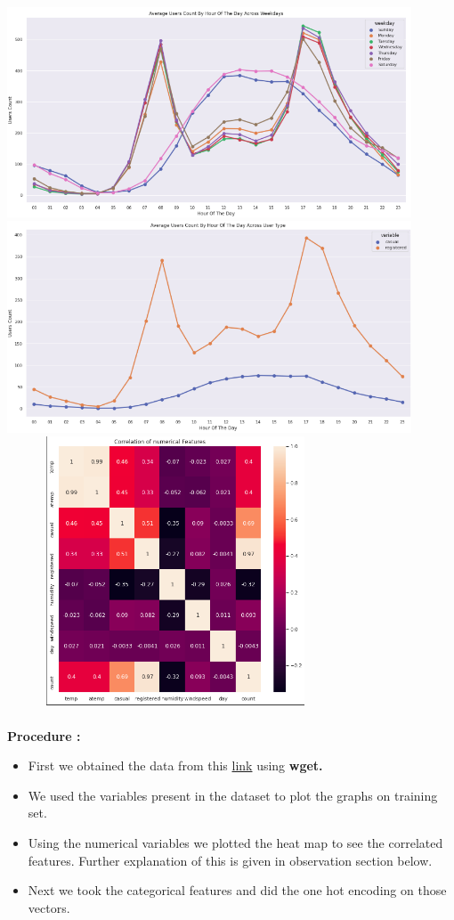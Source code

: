 \documentclass[english,a4paper,12pt]{article}
\begin{document}
\begin{enumerate}
\vspace{1cm}
\includegraphics[width=12cm]{pictures/Plot_Q4_4.png} \\
\vspace{1cm}
\includegraphics[width=12cm]{pictures/Plot_Q4_5.png} \\

\includegraphics[width=10cm,height=8cm]{pictures/CorrelnPlot_Q4.png} \\\\
\textbullet\textbf{Procedure :}
\begin{itemize}
    \item First we obtained the data from this \href{https://archive.ics.uci.edu/ml/machine-learning-databases/00275/Bike-Sharing-Dataset.zip}{link} using \textbf{wget.}
    \item We used the variables present in the dataset to plot the graphs on training set.
    \item Using the numerical variables we plotted the heat map to see the correlated features. Further explanation of this is given in observation section below.
    \item Next we took the categorical features and did the one hot encoding on those vectors.


\end{itemize}
\end{enumerate}
\end{document}

